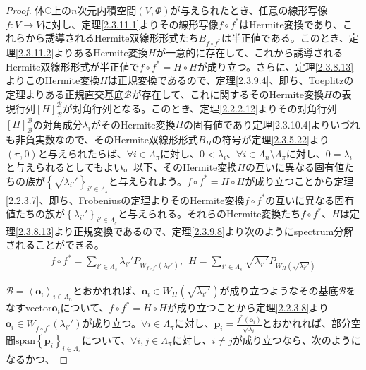 \documentclass[dvipdfmx]{jsarticle}
\begin{document}
\begin{proof}
体$\mathbb{C}$上の$n$次元内積空間$(V,\varPhi)$が与えられたとき、任意の線形写像$f:V \rightarrow V$に対し、定理\ref{2.3.11.1}よりその線形写像$f \circ f^{*}$はHermite変換であり、これらから誘導されるHermite双線形形式たち$B_{f \circ f^{*}}$は半正値である。このとき、定理\ref{2.3.11.2}よりあるHermite変換$H$が一意的に存在して、これから誘導されるHermite双線形形式が半正値で$f \circ f^{*} = H \circ H$が成り立つ。さらに、定理\ref{2.3.8.13}よりこのHermite変換$H$は正規変換であるので、定理\ref{2.3.9.4}、即ち、Toeplitzの定理よりある正規直交基底$\mathcal{B}$が存在して、これに関するそのHermite変換$H$の表現行列$[ H]_{\mathcal{B}}^{\mathcal{B}}$が対角行列となる。このとき、定理\ref{2.2.2.12}よりその対角行列$[ H]_{\mathcal{B}}^{\mathcal{B}}$の対角成分$\lambda_{i}$がそのHermite変換$H$の固有値であり定理\ref{2.3.10.4}よりいづれも非負実数なので、そのHermite双線形形式$B_{H}$の符号が定理\ref{2.3.5.22}より$(\pi,0)$と与えられたらば、$\forall i \in \varLambda_{\pi}$に対し、$0 < \lambda_{i}$、$\forall i \in \varLambda_{n} \setminus \varLambda_{\pi}$に対し、$0 = \lambda_{i}$と与えられるとしてもよい。以下、そのHermite変換$H$の互いに異なる固有値たちの族が$\left\{ \sqrt{\lambda_{i'}'} \right\}_{i' \in \varLambda_{s}}$と与えられよう。$f \circ f^{*} = H \circ H$が成り立つことから定理\ref{2.2.3.7}、即ち、Frobeniusの定理よりそのHermite変換$f \circ f^{*}$の互いに異なる固有値たちの族が$\left\{ \lambda_{i'}' \right\}_{i' \in \varLambda_{s}}$と与えられる。それらのHermite変換たち$f \circ f^{*}$、$H$は定理\ref{2.3.8.13}より正規変換であるので、定理\ref{2.3.9.8}より次のようにspectrum分解されることができる。
\begin{align*}
f \circ f^{*} = \sum_{i' \in \varLambda_{s}} {\lambda_{i'}'P_{W_{f \circ f^{*}}\left( \lambda_{i'}' \right)}},\ \ H = \sum_{i' \in \varLambda_{s}} {\sqrt{\lambda_{i'}'}P_{W_{H}\left( \sqrt{\lambda_{i'}'} \right)}}
\end{align*}\par
$\mathcal{B} =\left\langle \mathbf{o}_{i} \right\rangle_{i \in \varLambda_{n}}$とおかれれば、$\mathbf{o}_{i} \in W_{H}\left( \sqrt{\lambda_{i'}'} \right)$が成り立つようなその基底$\mathcal{B}$をなすvector$\mathbf{o}_{i}$について、$f \circ f^{*} = H \circ H$が成り立つことから定理\ref{2.2.3.8}より$\mathbf{o}_{i} \in W_{f \circ f^{*}}\left( \lambda_{i'}' \right)$が成り立つ。$\forall i \in \varLambda_{\pi}$に対し、$\mathbf{p}_{i} = \frac{f^{*}\left( \mathbf{o}_{i} \right)}{\sqrt{\lambda_{i}}}$とおかれれば、部分空間$\mathrm{span}\left\{ \mathbf{p}_{i} \right\}_{i \in \varLambda_{\pi}}$について、$\forall i,j \in \varLambda_{\pi}$に対し、$i \neq j$が成り立つなら、次のようになるかつ、

\end{proof}
\end{document}
